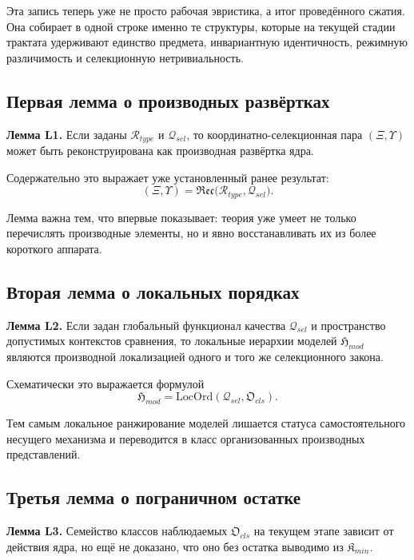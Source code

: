 \documentclass[12pt,a4paper]{article}
\begin{document}
Эта запись теперь уже не просто рабочая эвристика, а итог проведённого сжатия. Она собирает в одной строке именно те структуры, которые на текущей стадии трактата удерживают единство предмета, инвариантную идентичность, режимную различимость и селекционную нетривиальность.

\subsection{Первая лемма о производных развёртках}

\textbf{Лемма L1.} Если заданы \(\mathcal{R}_{type}\) и \(\mathcal{Q}_{sel}\), то координатно-селекционная пара \((\Xi,\Upsilon)\) может быть реконструирована как производная развёртка ядра.

Содержательно это выражает уже установленный ранее результат:
\begin{equation}
(\Xi,\Upsilon)=\mathfrak{Rec}\bigl(\mathcal{R}_{type},\mathcal{Q}_{sel}\bigr).
\end{equation}

Лемма важна тем, что впервые показывает: теория уже умеет не только перечислять производные элементы, но и явно восстанавливать их из более короткого аппарата.

\subsection{Вторая лемма о локальных порядках}

\textbf{Лемма L2.} Если задан глобальный функционал качества \(\mathcal{Q}_{sel}\) и пространство допустимых контекстов сравнения, то локальные иерархии моделей \(\mathfrak{H}_{mod}\) являются производной локализацией одного и того же селекционного закона.

Схематически это выражается формулой
\begin{equation}
\mathfrak{H}_{mod}=\mathrm{LocOrd}(\mathcal{Q}_{sel},\mathfrak{O}_{cls}).
\end{equation}

Тем самым локальное ранжирование моделей лишается статуса самостоятельного несущего механизма и переводится в класс организованных производных представлений.

\subsection{Третья лемма о пограничном остатке}

\textbf{Лемма L3.} Семейство классов наблюдаемых \(\mathfrak{O}_{cls}\) на текущем этапе зависит от действия ядра, но ещё не доказано, что оно без остатка выводимо из \(\mathfrak{K}_{min}\).
\end{document}
